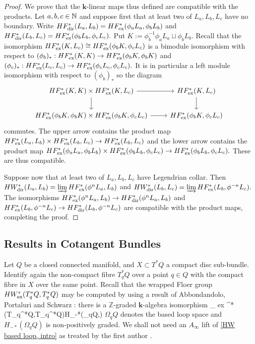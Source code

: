 \documentclass{article}
\theoremstyle{plain}%
\theoremstyle{definition}
\numberwithin{equation}{section}
\numberwithin{figure}{section}
\def\e#1\e{\begin{equation}#1\end{equation}}
\def\eq{\eqref}
\def\l{\label}
\def\Z{{\mathbin{\mathbb Z}}}
\def\ph{\phi}
\def\Om{\Omega}
\def\iy{\infty}
\def\k{{\mathbf{k}}}\def\b{{\mathbf{b}}}\def\x{{\mathbf{x}}}
\def\ex{{   {\rm ex}    }}\def\virt{{   {\rm virt}    }}\def\ev{{\rm ev}}\def\sing{{\rm sing}}\def\cont{{\rm cont}}
\begin{document}
\begin{proof}
We prove that the $\k$-linear maps thus defined are compatible with the products. 
Let $a,b,c\in{\mathbb N}$ and suppose first that at least two of $L_a,L_b,L_c$ have no boundary. 
Write $HF^*_{\rm dir}(L_a,L_b)=HF_\ex^*(\ph_aL_a,\ph_bL_b)$ and $HF^*_{\rm dir}(L_b,L_c)=HF_\ex^*(\ph_bL_b,\ph_cL_c).$
Put $K:=\ph_b^{-1}\ph_aL_a\sqcup \ph_bL_b.$
Recall that the isomorphism $HF_\ex^*(K,L_c)\cong HF_\ex^*(\ph_b K,\ph_cL_c)$ is a bimodule isomorphism with respect to $(\ph_b)_*:HF_\ex^*(K,K)\to HF_\ex^*(\ph_bK,\ph_bK)$ and $(\ph_c)_*:HF_\ex^*(L_c,L_c)\to HF_\ex^*(\ph_cL_c,\ph_cL_c).$ It is in particular a left module isomorphism with respect to $(\ph_b)_*$ so the diagram
\[
\begin{tikzcd}
HF_\ex^*(K,K)\times HF_\ex^*(K,L_c)\ar[r]\ar[d]& HF_\ex^*(K,L_c)\ar[d]\\
HF_\ex^*(\ph_bK,\ph_bK)\times HF_\ex^*(\ph_bK,\ph_cL_c)\ar[r]& HF_\ex^*(\ph_bK,\ph_cL_c)
\end{tikzcd}
\]
commutes. The upper arrow contains the product map $HF_\ex^*(L_a,L_b)\times HF_\ex^*(L_b,L_c)\to HF_\ex^*(L_b,L_c)$ and the lower arrow contains the product map $HF_\ex^*(\ph_aL_a,\ph_bL_b)\times HF_\ex^*(\ph_bL_b,\ph_cL_c)\to HF_\ex^*(\ph_bL_b,\ph_cL_c).$ These are thus compatible.

Suppose now that at least two of $L_a,L_b,L_c$ have Legendrian collar. Then $HW^*_{\rm dir}(L_a,L_b)=\varinjlim HF_\ex^*(\ph^nL_a,L_b)$ and $HW^*_{\rm dir}(L_b,L_c)=\varinjlim HF_\ex^*(L_b,\ph^{-n}L_c).$
The isomorphisms
$HF_\ex^*(\ph^n L_a, L_b)\to HF^*_{\rm dir}(\ph^n L_a, L_b)$
and
$HF_\ex^*(L_b, \ph^{-n}L_c)\to HF^*_{\rm dir}(L_b, \ph^{-n}L_c)$
are compatible with the product maps, completing the proof.
\end{proof}


\subsection{Results in Cotangent Bundles}\l{sec: cotangent}
Let $Q$ be a closed connected manifold, and $X\subset T^*Q$ a compact disc sub-bundle. Identify again the non-compact fibre $T^*_qQ$ over a point $q\in Q$ with the compact fibre in $X$ over the same point. Recall that the wrapped Floer group $HW_\ex^*(T_q^*Q,T_q^*Q)$ may be computed by using a result of Abbondandolo, Portaluri and Schwarz \cite[Theorem 7.1]{APS}: there is a $\Z$-graded $\k$-algebra isomorphism
\e\l{HW based loop, intro} HW_\ex^*(T_q^*Q,T_q^*Q)\cong H_{-*}(\Om_qQ,\k)\e
where $\Om_qQ$ denotes the based loop space and $H_{-*}(\Om_qQ)$ is non-positively graded. We shall not need an $A_\iy$ lift of \eq{HW based loop, intro} as treated by the first author \cite{Ab3}.
\end{document}
